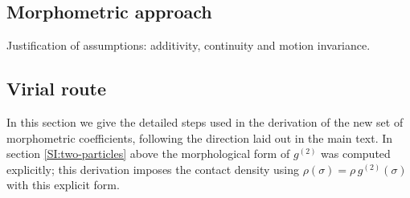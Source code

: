 \documentclass[11pt]{report}
\begin{document}
\subsection{Morphometric approach}

Justification of assumptions: additivity, continuity and motion invariance.

\subsection{Virial route}

In this section we give the detailed steps used in the derivation of the new set of morphometric coefficients, following the direction laid out in the main text.
In section \ref{SI:two-particles} above the morphological form of $g^{(2)}$ was computed explicitly; this derivation imposes the contact density using $\rho(\sigma) = \rho \, g^{(2)}(\sigma)$ with this explicit form.
\end{document}
